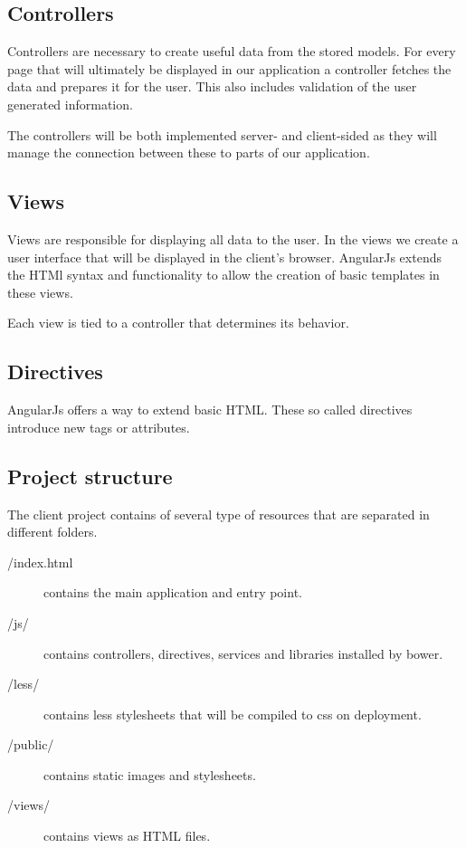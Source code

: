 \subsection{Controllers}\label{controllers}

Controllers are necessary to create useful data from the stored models.
For every page that will ultimately be displayed in our application a
controller fetches the data and prepares it for the user. This also
includes validation of the user generated information.

The controllers will be both implemented server- and client-sided as
they will manage the connection between these to parts of our
application.

\subsection{Views}\label{views}

Views are responsible for displaying all data to the user. In the views
we create a user interface that will be displayed in the client's
browser. AngularJs extends the HTMl syntax and functionality to allow
the creation of basic templates in these views.

Each view is tied to a controller that determines its behavior.

\subsection{Directives}\label{directives}

AngularJs offers a way to extend basic HTML. These so called directives
introduce new tags or attributes.

\subsection{Project structure}\label{project-structure}

The client project contains of several type of resources that are
separated in different folders.

\begin{description}
\item[/index.html] contains the main application and entry point.
\item[/js/] contains controllers, directives, services and libraries installed by bower.
\item[/less/] contains less stylesheets that will be compiled to css on deployment.
\item[/public/] contains static images and stylesheets.
\item[/views/] contains views as HTML files.
\end{description}

